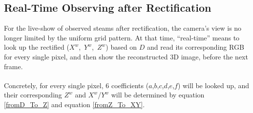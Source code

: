 \subsection{Real-Time Observing after Rectification}
%
For the live-show of observed steams after rectification, the camera's view is no longer limited by the uniform grid pattern. At that time, \enquote{real-time} means to look up the rectified (\(X^{w}\),\, \(Y^{w}\),\, \(Z^{w}\)) based on \(D\) and read its corresponding RGB for every single pixel, and then show the reconstructed 3D image, before the next frame.%
\\\\%
Concretely, for every single pixel, 6 coefficients (\(a\),\(b\),\(c\),\(d\),\(e\),\(f\)) will be looked up, and their corresponding \(Z^{w}\) and \(X^{w}\)/\(Y^{w}\) will be determined by equation \ref{fromD_To_Z} and equation \ref{fromZ_To_XY}.
%
%
%
%
%
%
%
%
%































